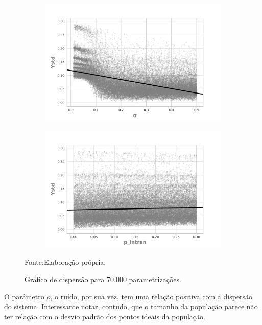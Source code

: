 \begin{figure}[H]
                \begin{subfigure}[b]{0.49\textwidth}
            \includegraphics[width=\textwidth]{ims/mutoregressions/regressionmutatingosigma.png}
          \end{subfigure}
                \begin{subfigure}[b]{0.49\textwidth}
            \includegraphics[width=\textwidth]{ims/mutoregressions/regressionmutatingop_intran.png}
    \end{subfigure}
    \caption{Gráfico de dispersão para 70.000 parametrizações.}
    \label{fig:scatter1}
    Fonte:Elaboração própria.
\end{figure}


O parâmetro \(\rho\), o ruído, por sua vez, tem uma relação positiva com a
dispersão do sistema. Interessante notar, contudo, que o tamanho da população
parece não ter relação com o desvio padrão dos pontos ideais da população.

